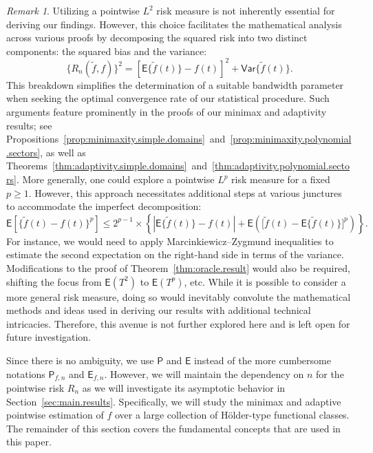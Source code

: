 \documentclass[bj,authoryear]{imsart}
\numberwithin{equation}{section}
\theoremstyle{plain}
\theoremstyle{remark}
\newtheorem{remark}{Remark}
\newcommand{\PP}{\mathsf{P}}
\newcommand{\EE}{\mathsf{E}}
\newcommand{\Var}{\mathsf{Var}}
\newcommand{\1}{\mathds{1}}
\newcommand{\pwrisk}{R_n}
\begin{document}
    \begin{remark}\label{rem:decomposition}\upshape
        Utilizing a pointwise $L^2$ risk measure is not inherently essential for deriving our findings. However, this choice facilitates the mathematical analysis across various proofs by decomposing the squared risk into two distinct components: the squared bias and the variance:
        \begin{equation*}
            \big\{\pwrisk(\tilde{f}, f)\big\}^2 = \left[\EE\big\{\tilde{f}(t)\big\} - f(t)\right]^2 + \Var\big\{\tilde{f}(t)\big\}.
        \end{equation*}
        This breakdown simplifies the determination of a suitable bandwidth parameter when seeking the optimal convergence rate of our statistical procedure. Such arguments feature prominently in the proofs of our minimax and adaptivity results; see Propositions~\ref{prop:minimaxity.simple.domains}~and~\ref{prop:minimaxity.polynomial.sectors}, as well as Theorems~\ref{thm:adaptivity.simple.domains}~and~\ref{thm:adaptivity.polynomial.sectors}. More generally, one could explore a pointwise $L^p$ risk measure for a fixed $p\geq 1$. However, this approach necessitates additional steps at various junctures to accommodate the imperfect decomposition:
        \begin{equation*}
            \EE\left[\big\{\tilde{f}(t) - f(t)\big\}^p\right] \leq 2^{p-1} \times \left\{\left|\EE\big\{\tilde{f}(t)\big\} - f(t)\right| + \EE\left(\big[\tilde{f}(t) - \EE\big\{\tilde{f}(t)\big\}\big]^p\right)\right\}.
        \end{equation*}
        For instance, we would need to apply Marcinkiewicz–Zygmund inequalities \citep[p.~498]{MR1368405} to estimate the second expectation on the right-hand side in terms of the variance. Modifications to the proof of Theorem~\ref{thm:oracle.result} would also be required, shifting the focus from $\EE(T^2)$ to $\EE(T^p)$, etc. While it is possible to consider a more general risk measure, doing so would inevitably convolute the mathematical methods and ideas used in deriving our results with additional technical intricacies. Therefore, this avenue is not further explored here and is left open for future investigation.
    \end{remark}

    Since there is no ambiguity, we use $\PP$ and $\EE$ instead of the more cumbersome notations $\PP_{\!f,n}$ and $\EE_{f,n}$. However, we will maintain the dependency on $n$ for the pointwise risk $\pwrisk$ as we will investigate its asymptotic behavior in Section~\ref{sec:main.results}. Specifically, we will study the minimax and adaptive pointwise estimation of $f$ over a large collection of H\"older-type functional classes. The remainder of this section covers the fundamental concepts that are used in this paper.
\end{document}
